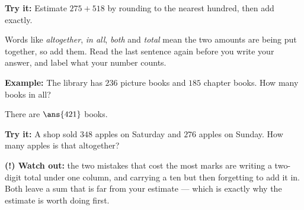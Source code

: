 \documentclass[12pt]{article}
\begin{document}
\begin{tryitbox}
\textbf{Try it:} Estimate $275 + 518$ by rounding to the nearest hundred, then
add exactly.\\[2pt]
\end{tryitbox}


\begin{formulabox}
Words like \emph{altogether}, \emph{in all}, \emph{both} and \emph{total} mean
the two amounts are being put together, so add them. Read the last sentence
again before you write your answer, and label what your number counts.
\end{formulabox}

\begin{examplebox}
\textbf{Example:} The library has $236$ picture books and $185$ chapter books.
How many books in all?

There are $\ans{421}$ books.
\end{examplebox}

\begin{tryitbox}
\textbf{Try it:} A shop sold $348$ apples on Saturday and $276$ apples on
Sunday. How many apples is that altogether?\\[2pt]
\end{tryitbox}

\begin{watchoutbox}
\textbf{(!) Watch out:} the two mistakes that cost the most marks are writing
a two-digit total under one column, and carrying a ten but then forgetting to
add it in. Both leave a sum that is far from your estimate --- which is
exactly why the estimate is worth doing first.
\end{watchoutbox}
\end{document}
